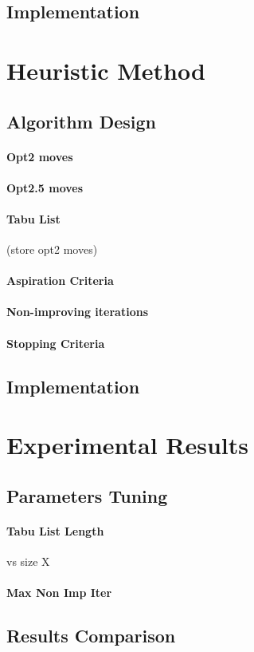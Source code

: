\documentclass{article}
\begin{document}
\subsection{Implementation}

\section{Heuristic Method}

\subsection{Algorithm Design}
\paragraph{Opt2 moves}
\paragraph{Opt2.5 moves}
\paragraph{Tabu List} (store opt2 moves)
\paragraph{Aspiration Criteria}
\paragraph{Non-improving iterations}
\paragraph{Stopping Criteria}

\subsection{Implementation}

\section{Experimental Results}

\subsection{Parameters Tuning}
\paragraph{Tabu List Length} vs size X 
\paragraph{Max Non Imp Iter}

\subsection{Results Comparison}
\end{document}
